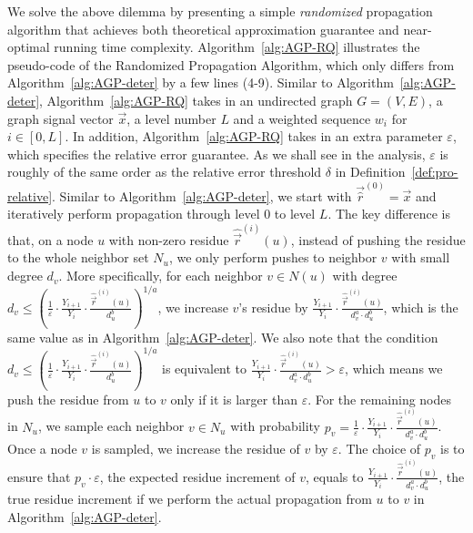  We solve the above dilemma by presenting a simple {\em randomized} propagation algorithm that achieves both theoretical approximation guarantee and near-optimal running time complexity. Algorithm~\ref{alg:AGP-RQ} illustrates the pseudo-code of the Randomized Propagation Algorithm, which only differs from Algorithm~\ref{alg:AGP-deter} by a few lines (4-9). Similar to Algorithm~\ref{alg:AGP-deter},  Algorithm~\ref{alg:AGP-RQ} takes in an undirected graph $G=(V,E)$, a graph signal vector $\vec{x}$, a level number $L$ and a weighted sequence $w_i$ for $i\in [0,L]$. In addition, Algorithm~\ref{alg:AGP-RQ}  takes in an extra parameter $\varepsilon$, which specifies the relative error guarantee. As we shall see in the analysis, $\varepsilon$ is roughly of  the same order as the relative error threshold $\delta$ in Definition~\ref{def:pro-relative}. Similar to Algorithm~\ref{alg:AGP-deter}, we start with $\vec{\hat{r}}^{(0)} = \vec{x}$ and iteratively perform propagation through level 0 to level $L$. The key difference is that, on a node $u$ with non-zero residue $\hat{\vec{r}}^{(i)}(u)$, instead of pushing the residue to the whole neighbor set $N_u$, we only perform pushes to neighbor $v$ with small degree $d_v$. More specifically, for each neighbor $v\in N(u)$ with degree $d_v \le \left( \frac{1}{\varepsilon} \cdot\frac{Y_{i+1}}{Y_i} \cdot \frac{\hat{\vec{r}}^{(i)}(u)}{d_u^b}\right)^{1/a}$, we increase $v$'s residue by $\frac{Y_{i+1}}{Y_i} \cdot \frac{\hat{\vec{{r}}}^{(i)}(u)}{d_v^a\cdot d_u^b}$, which is the same value as in Algorithm~\ref{alg:AGP-deter}. We also note that the condition  $d_v \le \left( \frac{1}{\varepsilon} \cdot\frac{Y_{i+1}}{Y_i} \cdot \frac{\hat{\vec{r}}^{(i)}(u)}{d_u^b}\right)^{1/a}$ is equivalent to $ \frac{Y_{i+1}}{Y_i} \cdot \frac{\hat{\vec{{r}}}^{(i)}(u)}{d_v^a\cdot d_u^b} > \varepsilon$, which means we push the residue from $u$ to $v$ only if it is larger than $\varepsilon$. For the remaining nodes in $N_u$, we sample each neighbor $v\in N_u$ with probability $p_v= \frac{1}{\varepsilon}\cdot \frac{Y_{i+1}}{Y_i}\cdot \frac{\hat{\vec{r}}^{(i)}(u)}{d_v^a\cdot d_u^b}$. Once a node $v$ is sampled, we increase the residue of $v$ by $\varepsilon$. The choice of $p_v$ is to ensure that $p_v\cdot \varepsilon$, the expected residue increment of $v$, equals to $\frac{Y_{i+1}}{Y_i} \cdot \frac{\hat{\vec{r}}^{(i)}(u)}{d_v^a\cdot d_u^b}$, the true residue increment if we perform the actual propagation from $u$ to $v$ in  Algorithm~\ref{alg:AGP-deter}. 


